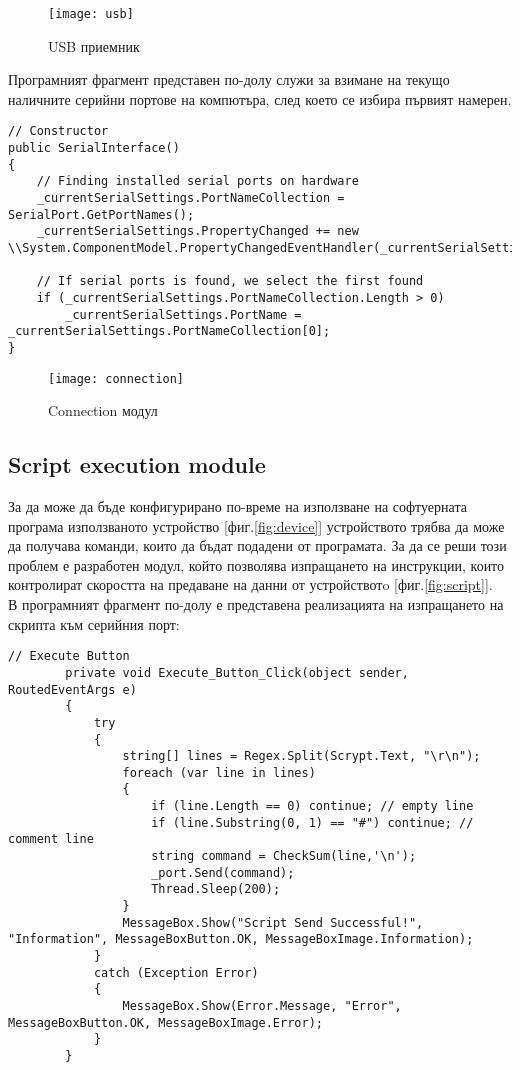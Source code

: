 \begin{figure}
    \centerline{\texttt{[image: usb]}}
    \caption{USB приемник}
    \label{fig:usb}
\end{figure}

Програмният фрагмент представен по-долу служи за взимане на текущо наличните серийни портове на компютъра, след което се избира първият намерен.
\begin{lstlisting}
// Constructor
public SerialInterface()
{
    // Finding installed serial ports on hardware
    _currentSerialSettings.PortNameCollection = SerialPort.GetPortNames();
    _currentSerialSettings.PropertyChanged += new \\System.ComponentModel.PropertyChangedEventHandler(_currentSerialSettings_PropertyChanged);

    // If serial ports is found, we select the first found
    if (_currentSerialSettings.PortNameCollection.Length > 0)
        _currentSerialSettings.PortName = _currentSerialSettings.PortNameCollection[0];
}
\end{lstlisting}



\begin{figure}
    \centerline{\texttt{[image: connection]}}
    \caption{Connection модул}
    \label{fig:connection}
\end{figure}




\subsection{Script execution module}
За да може да бъде конфигурирано по-време на използване на софтуерната програма използваното устройство [фиг.\ref{fig:device}] устройството трябва да може да получава команди, които да бъдат подадени от програмата. За да се реши този проблем е разработен модул, който позволява изпращането на инструкции, които контролират скоростта на предаване на данни от устройствотo [фиг.\ref{fig:script}].
\\
В програмният фрагмент по-долу е представена реализацията на изпращането на скрипта към серийния порт:
\begin{lstlisting}
// Execute Button
        private void Execute_Button_Click(object sender, RoutedEventArgs e)
        {
            try
            {
                string[] lines = Regex.Split(Scrypt.Text, "\r\n");
                foreach (var line in lines)
                {                    
                    if (line.Length == 0) continue; // empty line                    
                    if (line.Substring(0, 1) == "#") continue; // comment line
                    string command = CheckSum(line,'\n');
                    _port.Send(command); 
                    Thread.Sleep(200); 
                }
                MessageBox.Show("Script Send Successful!", "Information", MessageBoxButton.OK, MessageBoxImage.Information);
            }
            catch (Exception Error)
            {
                MessageBox.Show(Error.Message, "Error", MessageBoxButton.OK, MessageBoxImage.Error);
            }
        }
\end{lstlisting}




